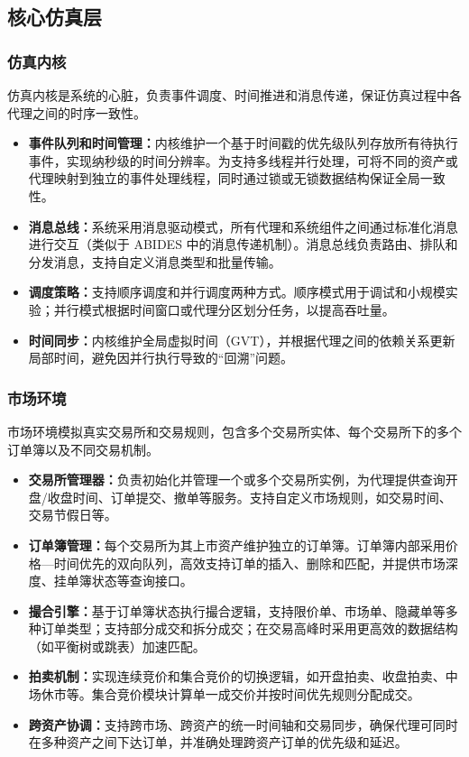 \subsection{核心仿真层}

\subsubsection{仿真内核}

仿真内核是系统的心脏，负责事件调度、时间推进和消息传递，保证仿真过程中各代理之间的时序一致性。


\begin{itemize}
  \item \textbf{事件队列和时间管理：}内核维护一个基于时间戳的优先级队列存放所有待执行事件，实现纳秒级的时间分辨率。为支持多线程并行处理，可将不同的资产或代理映射到独立的事件处理线程，同时通过锁或无锁数据结构保证全局一致性。
  \item \textbf{消息总线：}系统采用消息驱动模式，所有代理和系统组件之间通过标准化消息进行交互（类似于 ABIDES 中的消息传递机制）。消息总线负责路由、排队和分发消息，支持自定义消息类型和批量传输。
  \item \textbf{调度策略：}支持顺序调度和并行调度两种方式。顺序模式用于调试和小规模实验；并行模式根据时间窗口或代理分区划分任务，以提高吞吐量。
  \item \textbf{时间同步：}内核维护全局虚拟时间（GVT），并根据代理之间的依赖关系更新局部时间，避免因并行执行导致的“回溯”问题。
\end{itemize}

\subsubsection{市场环境}

市场环境模拟真实交易所和交易规则，包含多个交易所实体、每个交易所下的多个订单簿以及不同交易机制。

\begin{itemize}
  \item \textbf{交易所管理器：}负责初始化并管理一个或多个交易所实例，为代理提供查询开盘/收盘时间、订单提交、撤单等服务。支持自定义市场规则，如交易时间、交易节假日等。
  \item \textbf{订单簿管理：}每个交易所为其上市资产维护独立的订单簿。订单簿内部采用价格—时间优先的双向队列，高效支持订单的插入、删除和匹配，并提供市场深度、挂单簿状态等查询接口。
  \item \textbf{撮合引擎：}基于订单簿状态执行撮合逻辑，支持限价单、市场单、隐藏单等多种订单类型；支持部分成交和拆分成交；在交易高峰时采用更高效的数据结构（如平衡树或跳表）加速匹配。
  \item \textbf{拍卖机制：}实现连续竞价和集合竞价的切换逻辑，如开盘拍卖、收盘拍卖、中场休市等。集合竞价模块计算单一成交价并按时间优先规则分配成交。
  \item \textbf{跨资产协调：}支持跨市场、跨资产的统一时间轴和交易同步，确保代理可同时在多种资产之间下达订单，并准确处理跨资产订单的优先级和延迟。
\end{itemize}

